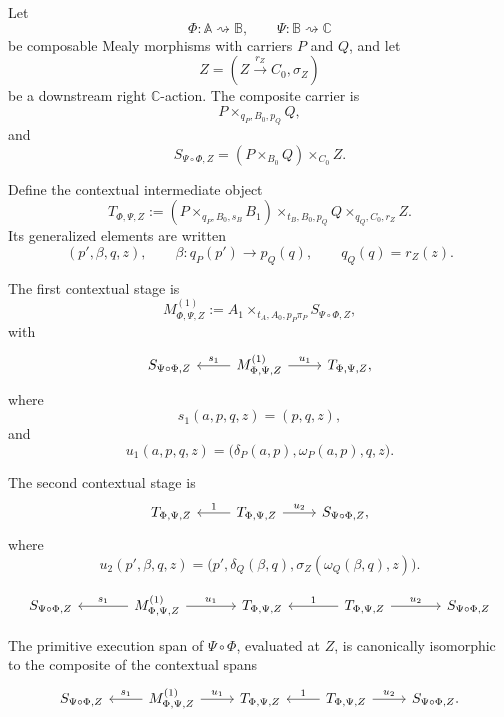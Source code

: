 Let
\[
    \Phi:\mathbb A\rightsquigarrow\mathbb B,
    \qquad
    \Psi:\mathbb B\rightsquigarrow\mathbb C
\]
be composable Mealy morphisms with carriers \(P\) and \(Q\), and let
\[
    Z=(Z\xrightarrow{r_Z}C_0,\sigma_Z)
\]
be a downstream right \(\mathbb C\)-action. The composite carrier is
\[
    P\times_{q_P,B_0,p_Q}Q,
\]
and
\[
    S_{\Psi\circ\Phi,Z}
    =
    (P\times_{B_0}Q)\times_{C_0}Z.
\]

Define the contextual intermediate object
\[
    T_{\Phi,\Psi,Z}
    :=
    \left(P\times_{q_P,B_0,s_B}B_1\right)
    \times_{t_B,B_0,p_Q}
    Q
    \times_{q_Q,C_0,r_Z}
    Z.
\]
Its generalized elements are written
\[
    (p',\beta,q,z),
    \qquad
    \beta:q_P(p')\to p_Q(q),
    \qquad
    q_Q(q)=r_Z(z).
\]

The first contextual stage is
\[
    M^{(1)}_{\Phi,\Psi,Z}
    :=
    A_1\times_{t_A,A_0,p_P\pi_P}S_{\Psi\circ\Phi,Z},
\]
with
\[
\begin{tikzcd}
S_{\Psi\circ\Phi,Z}
&
M^{(1)}_{\Phi,\Psi,Z}
    \arrow[l,"s_1"']
    \arrow[r,"u_1"]
&
T_{\Phi,\Psi,Z},
\end{tikzcd}
\]
where
\[
    s_1(a,p,q,z)=(p,q,z),
\]
and
\[
    u_1(a,p,q,z)
    =
    \bigl(\delta_P(a,p),\omega_P(a,p),q,z\bigr).
\]

The second contextual stage is
\[
\begin{tikzcd}
T_{\Phi,\Psi,Z}
&
T_{\Phi,\Psi,Z}
    \arrow[l,"1"']
    \arrow[r,"u_2"]
&
S_{\Psi\circ\Phi,Z},
\end{tikzcd}
\]
where
\[
    u_2(p',\beta,q,z)
    =
    \bigl(p',\delta_Q(\beta,q),\sigma_Z(\omega_Q(\beta,q),z)\bigr).
\]

\[
\begin{tikzcd}[column sep=large]
S_{\Psi\circ\Phi,Z}
&
M^{(1)}_{\Phi,\Psi,Z}
    \arrow[l,"s_1"']
    \arrow[r,"u_1"]
&
T_{\Phi,\Psi,Z}
&
T_{\Phi,\Psi,Z}
    \arrow[l,"1"']
    \arrow[r,"u_2"]
&
S_{\Psi\circ\Phi,Z}
\end{tikzcd}
\]

\begin{theorem}
\label{thm:cmett-sequential-composition-contextual-pasting}
    The primitive execution span of \(\Psi\circ\Phi\), evaluated at \(Z\), is
    canonically isomorphic to the composite of the contextual spans
    \[
    \begin{tikzcd}
    S_{\Psi\circ\Phi,Z}
    &
    M^{(1)}_{\Phi,\Psi,Z}
        \arrow[l,"s_1"']
        \arrow[r,"u_1"]
    &
    T_{\Phi,\Psi,Z}
    &
    T_{\Phi,\Psi,Z}
        \arrow[l,"1"']
        \arrow[r,"u_2"]
    &
    S_{\Psi\circ\Phi,Z}.
    \end{tikzcd}
    \]
\end{theorem}

